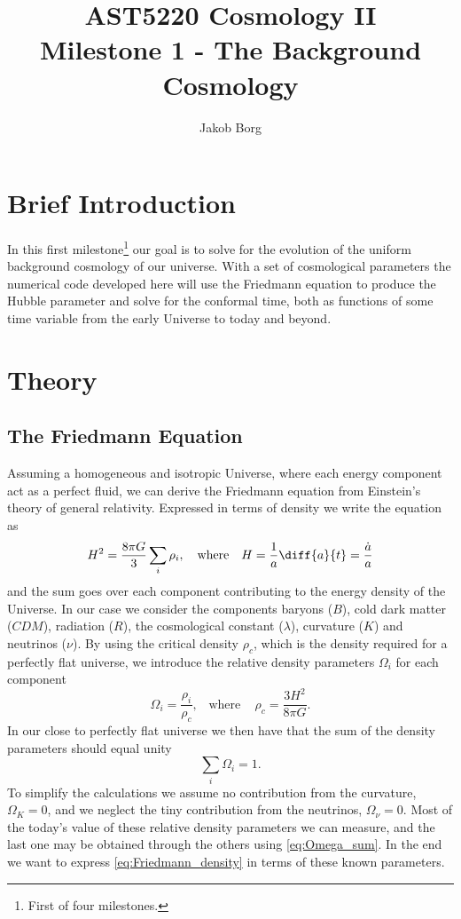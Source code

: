 \documentclass[10pt,a4paper]{article}
\title{AST5220 Cosmology \rm{II}\\ 
\vspace{5mm}Milestone 1 - The Background Cosmology}
\author{Jakob Borg}
\providecommand{\qwhere}
{
    \ensuremath{
    ,\quad \text{where} \quad 
    }
}
\begin{document}

\maketitle


\section{Brief Introduction}
\label{sec:Intro}
In this first milestone\footnote{First of four milestones.} our goal is to solve for the evolution of the uniform background cosmology of our universe. With a set of cosmological parameters the numerical code developed here will use the Friedmann equation to produce the Hubble parameter and solve for the conformal time, both as functions of some time variable from the early Universe to today and beyond.

\section{Theory}
\label{sec:Theory}
\subsection{The Friedmann Equation}
\label{subsec:Theory/Friedmann}
Assuming a homogeneous and isotropic Universe, where each energy component act as a perfect fluid, we can derive the Friedmann equation from Einstein's theory of general relativity. Expressed in terms of density we write the equation as
%
\begin{equation}
    H^2 = \frac{8\pi G}{3} \sum_i \rho_i \qwhere H = \frac{1}{a}\diff{a}{t} = \frac{\dot{a}}{a}
    \label{eq:Friedmann_density}
\end{equation}
%
and the sum goes over each component contributing to the energy density of the Universe. In our case we consider the components baryons ($B$), cold dark matter ($CDM$), radiation ($R$), the cosmological constant ($\lambda$), curvature ($K$) and neutrinos ($\nu$). By using the critical density $\rho_c$, which is the density required for a perfectly flat universe, we introduce the relative density parameters $\Omega_i$ for each component
%
\begin{equation}
    \Omega_i = \frac{\rho_i}{\rho_c} \qwhere \rho_c = \frac{3H^2}{8\pi G}.
    \label{eq:Omega_i}
\end{equation}
%
In our close to perfectly flat universe we then have that the sum of the density parameters should equal unity
%
\begin{equation}
    \sum_i \Omega_i = 1.
    \label{eq:Omega_sum}
\end{equation}
%
To simplify the calculations we assume no contribution from the curvature, $\Omega_K=0$, and we neglect the tiny contribution from the neutrinos, $\Omega_\nu = 0$. Most of the today's value of these relative density parameters we can measure, and the last one may be obtained through the others using \cref{eq:Omega_sum}. In the end we want to express \cref{eq:Friedmann_density} in terms of these known parameters.
\end{document}
